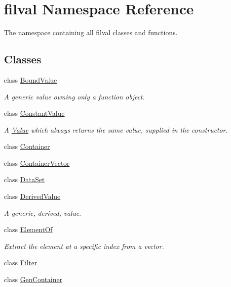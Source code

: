 \hypertarget{namespacefilval}{}\section{filval Namespace Reference}
\label{namespacefilval}


The namespace containing all filval classes and functions.  


\subsection*{Classes}
\begin{DoxyCompactItemize}
\item 
class \hyperlink{classfilval_1_1BoundValue}{Bound\+Value}
\begin{DoxyCompactList}\small\item\em A generic value owning only a function object. \end{DoxyCompactList}\item 
class \hyperlink{classfilval_1_1ConstantValue}{Constant\+Value}
\begin{DoxyCompactList}\small\item\em A \hyperlink{classfilval_1_1Value}{Value} which always returns the same value, supplied in the constructor. \end{DoxyCompactList}\item 
class \hyperlink{classfilval_1_1Container}{Container}
\item 
class \hyperlink{classfilval_1_1ContainerVector}{Container\+Vector}
\item 
class \hyperlink{classfilval_1_1DataSet}{Data\+Set}
\item 
class \hyperlink{classfilval_1_1DerivedValue}{Derived\+Value}
\begin{DoxyCompactList}\small\item\em A generic, derived, value. \end{DoxyCompactList}\item 
class \hyperlink{classfilval_1_1ElementOf}{Element\+Of}
\begin{DoxyCompactList}\small\item\em Extract the element at a specific index from a vector. \end{DoxyCompactList}\item 
class \hyperlink{classfilval_1_1Filter}{Filter}
\item 
class \hyperlink{classfilval_1_1GenContainer}{Gen\+Container}
\item 

\end{DoxyCompactItemize}
